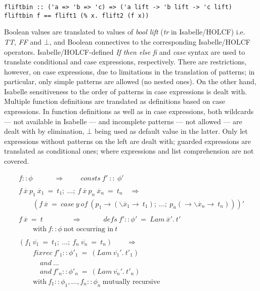 \documentclass{llncs}
\begin{document}
\begin{verbatim}
fliftbin :: ('a => 'b => 'c) => ('a lift -> 'b lift -> 'c lift) 
fliftbin f == flift1 (% x. flift2 (f x))
\end{verbatim}
\noindent Boolean values are translated to values of \emph{bool lift} 
(\emph{tr} in Isabelle/HOLCF) i.e.  \emph{TT}, \emph{FF} and $\bot$, and
Boolean connectives to the corresponding Isabelle/HOLCF operators.
Isabelle/HOLCF-defined \emph{If then else fi} and \emph{case} syntax are used
to translate conditional and case expressions, respectively.  There are
restrictions, however, on case expressions, due to limitations in the
translation of patterns; in particular, only simple patterns are allowed (no
nested ones). On the other hand, Isabelle sensitiveness to the order of
patterns in case expressions is dealt with. Multiple function definitions are
translated as definitions based on case expressions. In function definitions
as well as in case expressions, both wildcards --- not available in Isabelle
--- and incomplete patterns --- not allowed --- are dealt with by elimination,
$\bot$ being used as default value in the latter. Only let expressions
without patterns on the left are dealt with; guarded expressions are
translated as conditional ones; where expressions and list comprehension are
not covered.



$$\begin{array}{l}
  f :: \phi \qquad \quad \Longrightarrow \qquad 
  \ consts \ f' \ :: \ \phi' \\
   \\
 f \ \overline{x} \ p_1 \ \overline{x}_1 \ = \ t_1; \ 
  \ldots;
  \ f \ \overline{x} \ p_n \ \overline{x}_n \ = \ t_n \quad \Longrightarrow \\
  \qquad (f \ \overline{x} \ = \ case \ y \ of \ (p_1 \to (\backslash
  \overline{x}_1 \to \ t_1); \ 
  \ldots; \ p_n (\to \backslash \overline{x}_n \to \ t_n)))' \\
 \\
  f \ \overline{x} \ = \ t \qquad \qquad \Longrightarrow \qquad \quad 
                defs \ f' :: \phi' \ = \ Lam \ \overline{x}'. \ t' \\
  \qquad \mbox{with} \ f::\phi \ \mbox{not \ occurring \ in} \ t \\
 \\
  (f_1 \ \overline{v_1} \ = \ t_1; \ \ldots;
  \ f_n \ \overline{v_n} \ = \ t_n) \qquad \Longrightarrow \\
  \qquad fixrec \ f'_1 :: \phi'_1 \ =  
    \ (Lam \ \overline{v_1}'. \ t'_1)  \\
  \qquad \quad and \ \ldots \\
  \qquad \quad and \ f'_n :: \phi'_n \ =
  \ (Lam \ \overline{v_n}'. \ t'_n) \\
  \qquad \mbox{with} \ f_1::\phi_1, \ldots, f_n::\phi_n \ 
  \mbox{mutually \ recursive} \\
\end{array}$$\\
\end{document}
